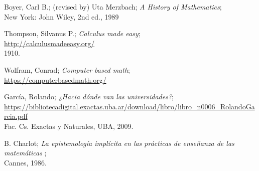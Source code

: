 \documentclass[a4paper,11pt]{article}
\begin{document}
\begin{thebibliography}{99}
\bibitem{}
Boyer, Carl B.; (revised by) Uta Merzbach; \emph{A History of Mathematics};\\
New York: John Wiley, 2nd ed., 1989



\bibitem{}
Thompson, Silvanus P.; \emph{Calculus made easy};\\
\url{http://calculusmadeeasy.org/}\\
1910.

\bibitem{}
Wolfram, Conrad; \emph{Computer based math};\\
\url{https://computerbasedmath.org/}

\bibitem{}
García, Rolando; \emph{¿Hacia dónde van las universidades?};\\
\url{https://bibliotecadigital.exactas.uba.ar/download/libro/libro_n0006_RolandoGarcia.pdf}\\
Fac. Cs. Exactas y Naturales, UBA, 2009.


\bibitem{}
B. Charlot; \emph{La epistemología implícita en las prácticas de enseñanza de las matemáticas 
};\\
Cannes, 1986.
  


\end{thebibliography}
\end{document}
